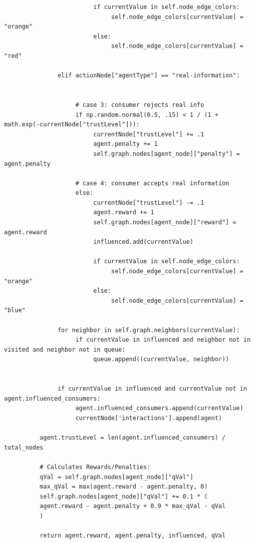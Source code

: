 \documentclass[twoside]{article}
\begin{document}
\begin{verbatim}
                         if currentValue in self.node_edge_colors:
                              self.node_edge_colors[currentValue] = "orange"
                         else:
                              self.node_edge_colors[currentValue] = "red"
                         
               elif actionNode["agentType"] == "real-information":


                    # case 3: consumer rejects real info
                    if np.random.normal(0.5, .15) < 1 / (1 + math.exp(-currentNode["trustLevel"])):
                         currentNode["trustLevel"] += .1
                         agent.penalty += 1
                         self.graph.nodes[agent_node]["penalty"] = agent.penalty
                         
                    # case 4: consumer accepts real information
                    else:
                         currentNode["trustLevel"] -= .1
                         agent.reward += 1
                         self.graph.nodes[agent_node]["reward"] = agent.reward
                         influenced.add(currentValue)

                         if currentValue in self.node_edge_colors:
                              self.node_edge_colors[currentValue] = "orange"
                         else:
                              self.node_edge_colors[currentValue] = "blue"

               for neighbor in self.graph.neighbors(currentValue):
                    if currentValue in influenced and neighbor not in visited and neighbor not in queue:
                         queue.append((currentValue, neighbor))
               

               if currentValue in influenced and currentValue not in agent.influenced_consumers:
                    agent.influenced_consumers.append(currentValue)
                    currentNode['interactions'].append(agent)

          agent.trustLevel = len(agent.influenced_consumers) / total_nodes
          
          # Calculates Rewards/Penalties:
          qVal = self.graph.nodes[agent_node]["qVal"]
          max_qVal = max(agent.reward - agent.penalty, 0)
          self.graph.nodes[agent_node]["qVal"] += 0.1 * (
          agent.reward - agent.penalty + 0.9 * max_qVal - qVal
          )

          return agent.reward, agent.penalty, influenced, qVal
\end{verbatim}
\end{document}

